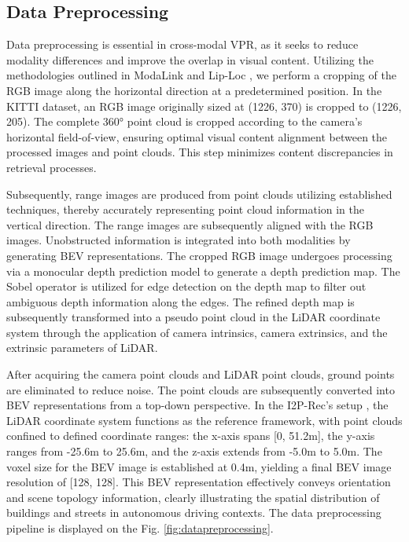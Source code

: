 \subsection{Data Preprocessing}
Data preprocessing is essential in cross-modal VPR, as it seeks to reduce modality differences and improve the overlap in visual content. Utilizing the methodologies outlined in ModaLink \cite{xie2024modalink} and Lip-Loc \cite{shubodh2024lip}, we perform a cropping of the RGB image along the horizontal direction at a predetermined position. In the KITTI dataset, an RGB image originally sized at (1226, 370) is cropped to (1226, 205). The complete 360° point cloud is cropped according to the camera's horizontal field-of-view, ensuring optimal visual content alignment between the processed images and point clouds. This step minimizes content discrepancies in retrieval processes.

Subsequently, range images are produced from point clouds utilizing established techniques, thereby accurately representing point cloud information in the vertical direction. The range images are subsequently aligned with the RGB images. Unobstructed information is integrated into both modalities by generating BEV representations. The cropped RGB image undergoes processing via a monocular depth prediction model to generate a depth prediction map. The Sobel operator is utilized for edge detection on the depth map to filter out ambiguous depth information along the edges. The refined depth map is subsequently transformed into a pseudo point cloud in the LiDAR coordinate system through the application of camera intrinsics, camera extrinsics, and the extrinsic parameters of LiDAR.

After acquiring the camera point clouds and LiDAR point clouds, ground points are eliminated to reduce noise. The point clouds are subsequently converted into BEV representations from a top-down perspective. In the I2P-Rec's setup \cite{zheng2023i2p}, the LiDAR coordinate system functions as the reference framework, with point clouds confined to defined coordinate ranges: the x-axis spans [0, 51.2m], the y-axis ranges from -25.6m to 25.6m, and the z-axis extends from -5.0m to 5.0m. The voxel size for the BEV image is established at 0.4m, yielding a final BEV image resolution of [128, 128]. This BEV representation effectively conveys orientation and scene topology information, clearly illustrating the spatial distribution of buildings and streets in autonomous driving contexts. The data preprocessing pipeline is displayed on the Fig. \ref{fig:datapreprocessing}.

